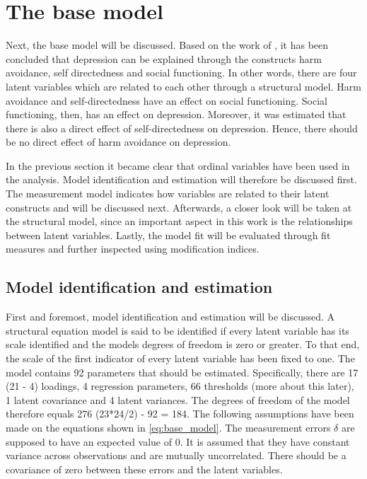 \documentclass[11pt]{article}
\begin{document}

\FloatBarrier
\pagebreak
\section{The base model}

Next, the base model will be discussed. Based on the work of \textcite{tse2011},
it has been concluded that depression can be explained through the constructs
harm avoidance, self directedness and social functioning. In other words, there
are four latent variables which are related to each other through a structural
model. Harm avoidance and self-directedness have an effect on social functioning.
Social functioning, then, has an effect on depression. Moreover, it was estimated
that there is also a direct effect of self-directedness on depression.
Hence, there should be no direct effect of harm avoidance on depression.

In the previous section it became clear that ordinal variables have been used in
the analysis. Model identification and estimation will therefore be discussed
first. The measurement model indicates how variables are related to their latent
constructs and will be discussed next. Afterwards, a closer look will be taken
at the structural model, since an important aspect in this work is the
relationships between latent variables. Lastly, the model fit will be evaluated
through fit measures and further inspected using modification indices.

\subsection{Model identification and estimation}

First and foremost, model identification and estimation will be discussed.
A structural equation model is said to be identified if every latent variable
has its scale identified and the models degrees of freedom is zero or greater.
To that end, the scale of the first indicator of every latent variable has been
fixed to one. The model contains 92 parameters that should be estimated.
Specifically, there are 17 (21 - 4) loadings, 4 regression parameters, 66
thresholds (more about this later), 1 latent covariance and 4 latent variances.
The degrees of freedom of the model therefore equals 276 (23*24/2) - 92 = 184.
The following assumptions have been made on the equations shown
in \ref{eq:base_model}. The measurement errors $\delta$ are supposed to have an
expected value of 0. It is assumed that they have constant variance across
observations and are mutually uncorrelated. There should be a covariance of zero
between these errors and the latent variables.
\end{document}
